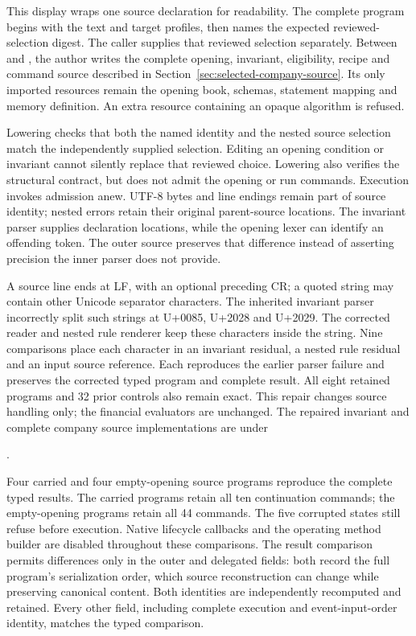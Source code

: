 This display wraps one source declaration for readability. The complete
program begins with the text and target profiles, then names the expected
reviewed-selection digest. The caller supplies that reviewed selection
separately. Between  and
, the author writes the complete opening,
invariant, eligibility, recipe and command source described in
Section~\ref{sec:selected-company-source}. Its only imported resources remain
the opening book, schemas, statement mapping and memory definition. An extra
resource containing an opaque algorithm is refused.

Lowering checks that both the named identity and the nested source selection
match the independently supplied selection. Editing an opening condition or
invariant cannot silently replace that reviewed choice. Lowering also verifies
the structural contract, but does not admit the opening or run commands.
Execution invokes admission anew. UTF-8 bytes and line endings remain part of
source identity; nested errors retain their original parent-source locations.
The invariant parser supplies declaration locations, while the opening lexer
can identify an offending token. The outer source preserves that difference
instead of asserting precision the inner parser does not provide.

A source line ends at LF, with an optional preceding CR; a quoted string may
contain other Unicode separator characters. The inherited invariant parser
incorrectly split such strings at U+0085, U+2028 and U+2029. The corrected
reader and nested rule renderer keep these characters inside the string.
Nine comparisons place each character in an invariant residual, a nested
rule residual and an input source reference. Each reproduces the earlier
parser failure and preserves the corrected typed program and complete result.
All eight retained programs and 32 prior controls also remain exact. This
repair changes source handling only; the financial evaluators are unchanged.
The repaired invariant and complete company source implementations are under
\begingroup\raggedright
{}.
\par\endgroup

Four carried and four empty-opening source programs reproduce the complete
typed results. The carried programs retain all ten continuation commands;
the empty-opening programs retain all 44 commands. The five corrupted states
still refuse before execution. Native lifecycle callbacks and the operating
method builder are disabled throughout these comparisons. The result
comparison permits differences only in the outer and delegated
 fields: both record the full program's
serialization order, which source reconstruction can change while preserving
canonical content. Both identities are independently recomputed and retained.
Every other field, including complete execution and event-input-order identity,
matches the typed comparison.

